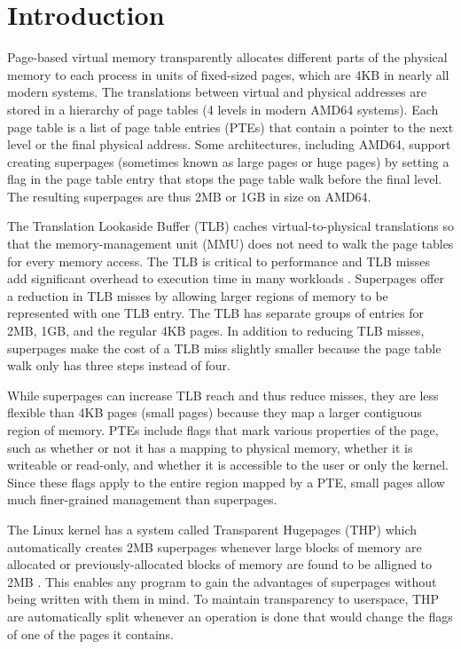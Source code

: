 \chapter{Introduction}

Page-based virtual memory transparently allocates different parts of the physical memory to each process in units of fixed-sized pages, which are 4KB in nearly all modern systems. The translations between virtual and physical addresses are stored in a hierarchy of page tables (4 levels in modern AMD64 systems). Each page table is a list of page table entries (PTEs) that contain a pointer to the next level or the final physical address. Some architectures, including AMD64, support creating superpages (sometimes known as large pages or huge pages) by setting a flag in the page table entry that stops the page table walk before the final level. The resulting superpages are thus 2MB or 1GB in size on AMD64.

The Translation Lookaside Buffer (TLB) caches virtual-to-physical translations so that the memory-management unit (MMU) does not need to walk the page tables for every memory access. The TLB is critical to performance and TLB misses add significant overhead to execution time in many workloads \cite{Barr}. Superpages offer a reduction in TLB misses by allowing larger regions of memory to be represented with one TLB entry. The TLB has separate groups of entries for 2MB, 1GB, and the regular 4KB pages. In addition to reducing TLB misses, superpages make the cost of a TLB miss slightly smaller because the page table walk only has three steps instead of four.

While superpages can increase TLB reach and thus reduce misses, they are less flexible than 4KB pages (small pages) because they map a larger contiguous region of memory. PTEs include flags that mark various properties of the page, such as whether or not it has a mapping to physical memory, whether it is writeable or read-only, and whether it is accessible to the user or only the kernel. Since these flags apply to the entire region mapped by a PTE, small pages allow much finer-grained management than superpages.

The Linux kernel has a system called Transparent Hugepages (THP) which automatically creates 2MB superpages whenever large blocks of memory are allocated or previously-allocated blocks of memory are found to be alligned to 2MB \cite{THP}. This enables any program to gain the advantages of superpages without being written with them in mind. To maintain transparency to userspace, THP are automatically split whenever an operation is done that would change the flags of one of the pages it contains.

